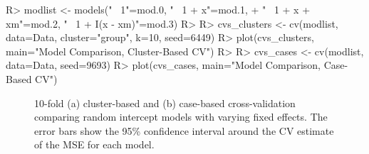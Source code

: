 \documentclass[
]{jss}
\begin{document}
\begin{CodeChunk}
\begin{CodeInput}
R> modlist <- models("~ 1"=mod.0, "~ 1 + x"=mod.1, 
+                   "~ 1 + x + xm"=mod.2, "~ 1 + I(x - xm)"=mod.3)
R> 
R> cvs_clusters <- cv(modlist, data=Data, cluster="group", k=10, seed=6449)
R> plot(cvs_clusters, main="Model Comparison, Cluster-Based CV")
R> 
R> cvs_cases <- cv(modlist, data=Data, seed=9693)
R> plot(cvs_cases, main="Model Comparison, Case-Based CV")
\end{CodeInput}
\begin{figure}

{\centering {}

}

\caption[10-fold (a) cluster-based and (b) case-based cross-validation comparing random intercept models with varying fixed effects]{10-fold (a) cluster-based and (b) case-based cross-validation comparing random intercept models with varying fixed effects. The error bars show the 95\% confidence interval around the CV estimate of the MSE for each model.}\label{fig:cross-validation-clusters}
\end{figure}
\end{CodeChunk}
\end{document}
